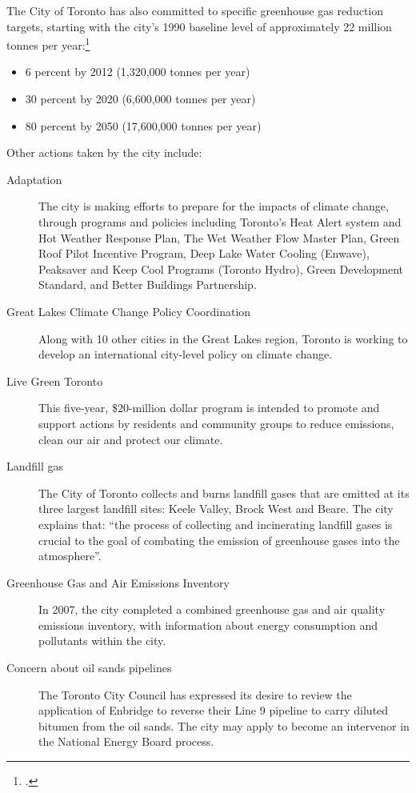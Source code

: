 The City of Toronto has also committed to specific greenhouse gas reduction targets, starting with the city's 1990 baseline level of approximately 22 million tonnes per year:\footcite{TorontoAQandCC}
\begin{itemize}
	\item 6 percent by 2012 (1,320,000 tonnes per year)
	\item 30 percent by 2020 (6,600,000 tonnes per year)
	\item 80 percent by 2050 (17,600,000 tonnes per year)
\end{itemize}

Other actions taken by the city include:
\begin{description}
	\item [Adaptation] The city is making efforts to prepare for the impacts of climate change, through programs and policies including Toronto’s Heat Alert system and Hot Weather Response Plan, The Wet Weather Flow Master Plan, Green Roof Pilot Incentive Program, Deep Lake Water Cooling (Enwave), Peaksaver and Keep Cool Programs (Toronto Hydro), Green Development Standard, and Better Buildings Partnership.
	\item [Great Lakes Climate Change Policy Coordination] Along with 10 other cities in the Great Lakes region, Toronto is working to develop an international city-level policy on climate change.
	\item [Live Green Toronto] This  five-year, \$20-million dollar program is intended to promote and support actions by residents and community groups to reduce emissions, clean our air and protect our climate.
	\item [Landfill gas] The City of Toronto collects and burns landfill gases that are emitted at its three largest landfill sites: Keele Valley, Brock West and Beare. The city explains that: ``the process of collecting and incinerating landfill gases is crucial to the goal of combating the emission of greenhouse gases into the atmosphere''.\cite{TorontoAQandCC}
	\item [Greenhouse Gas and Air Emissions Inventory] In 2007, the city completed a combined greenhouse gas and air quality emissions inventory, with information about energy consumption and pollutants within the city. 
	\item [Concern about oil sands pipelines] The Toronto City Council has expressed its desire to review the application of Enbridge to reverse their Line 9 pipeline to carry diluted bitumen from the oil sands. 
	The city may apply to become an intervenor in the National Energy Board process.
\end{description}



